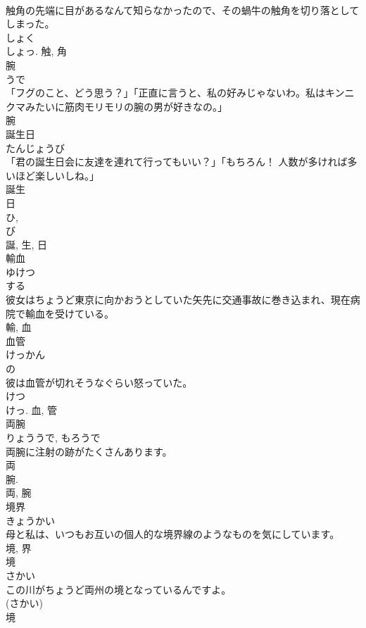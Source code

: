 \documentclass[8pt]{extreport}
\begin{document}
\begin{CJK}{UTF8}{min}
\\	触角の先端に目があるなんて知らなかったので、その蝸牛の触角を切り落としてしまった。	
\\	しょく 
\\	しょっ.	触, 角	
\\	腕	
\\	うで	
\\	「フグのこと、どう思う？」「正直に言うと、私の好みじゃないわ。私はキンニクマみたいに筋肉モリモリの腕の男が好きなの。」	
\\	腕	
\\	誕生日	
\\	たんじょうび	
\\	「君の誕生日会に友達を連れて行ってもいい？」「もちろん！ 人数が多ければ多いほど楽しいしね。」	
\\	誕生 
\\	日 
\\	ひ, 
\\	び 
\\	誕, 生, 日	
\\	輸血	
\\	ゆけつ	
\\	する 
\\	彼女はちょうど東京に向かおうとしていた矢先に交通事故に巻き込まれ、現在病院で輸血を受けている。	
\\	輸, 血	
\\	血管	
\\	けっかん	
\\	の 
\\	彼は血管が切れそうなぐらい怒っていた。	
\\	けつ 
\\	けっ.	血, 管	
\\	両腕	
\\	りょううで, もろうで	
\\	両腕に注射の跡がたくさんあります。	
\\	両 
\\	腕. 
\\	両, 腕	
\\	境界	
\\	きょうかい	
\\	母と私は、いつもお互いの個人的な境界線のようなものを気にしています。	
\\	境, 界	
\\	境	
\\	さかい	
\\	この川がちょうど両州の境となっているんですよ。	
\\	(さかい) 
\\	境	

\end{CJK}
\end{document}
